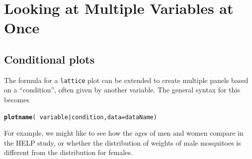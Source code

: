 \documentclass[twoside]{book}\usepackage[]{graphicx}\usepackage[]{xcolor}
\makeatletter
\newcommand{\hlopt}[1]{\textcolor[rgb]{0,0,0}{#1}}%
\newcommand{\hlstd}[1]{\textcolor[rgb]{0.345,0.345,0.345}{#1}}%
\newcommand{\hlkwc}[1]{\textcolor[rgb]{0.333,0.667,0.333}{#1}}%
\newcommand{\hlkwd}[1]{\textcolor[rgb]{0.737,0.353,0.396}{\textbf{#1}}}%
\newenvironment{kframe}{%
 \def\at@end@of@kframe{}%
 \ifinner\ifhmode%
  \def\at@end@of@kframe{\end{minipage}}%
  \begin{minipage}{\columnwidth}%
 \fi\fi%
 \def\FrameCommand##1{\hskip\@totalleftmargin \hskip-\fboxsep
 \colorbox{shadecolor}{##1}\hskip-\fboxsep
     \hskip-\linewidth \hskip-\@totalleftmargin \hskip\columnwidth}%
 \MakeFramed {\advance\hsize-\width
   \@totalleftmargin\z@ \linewidth\hsize
   \@setminipage}}%
 {\par\unskip\endMakeFramed%
 \at@end@of@kframe}
\newenvironment{knitrout}{}{} %
\newcommand{\Rindex}[1]{\index{\texttt{#1}}}
\newcommand{\pkg}[1]{{\color{red!80!black}\texttt{#1}}\Rindex{#1}}
\newcounter{example}[section]
\makeatother
\begin{document}
\section{Looking at Multiple Variables at Once}

\subsection{Conditional plots}
The formula for a \pkg{lattice} plot can be extended to create multiple
panels based on a ``condition'', often given by another variable.  The 
general syntax for this becomes
\begin{knitrout}
\color{fgcolor}\begin{kframe}
\begin{alltt}
\hlkwd{plotname}\hlstd{(} \hlopt{~} \hlstd{variable} \hlopt{|} \hlstd{condition,} \hlkwc{data}\hlstd{=dataName )}
\end{alltt}
\end{kframe}
\end{knitrout}

For example, we might like to see how the ages of men and women compare 
in the HELP study, or whether the distribution of weights of male mosquitoes 
is different from the distribution for females.
\end{document}
